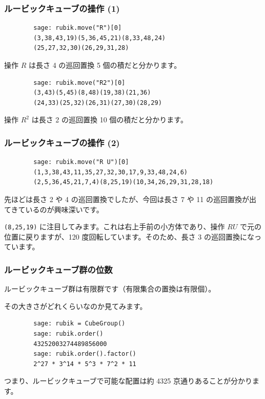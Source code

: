 \documentclass{beamer}
\begin{document}
\begin{frame}[fragile=singleslide]
    \frametitle{ルービックキューブの操作 (1)}

    \begin{verbatim}
        sage: rubik.move("R")[0]
        (3,38,43,19)(5,36,45,21)(8,33,48,24)
        (25,27,32,30)(26,29,31,28)
    \end{verbatim}

    \bigskip

    操作 \(R\) は長さ 4 の巡回置換 5 個の積だと分かります。

    \bigskip

    \begin{verbatim}
        sage: rubik.move("R2")[0]
        (3,43)(5,45)(8,48)(19,38)(21,36)
        (24,33)(25,32)(26,31)(27,30)(28,29)
    \end{verbatim}

    \bigskip

    操作 \(R^2\) は長さ 2 の巡回置換 10 個の積だと分かります。
\end{frame}

\begin{frame}[fragile=singleslide]
    \frametitle{ルービックキューブの操作 (2)}

    \begin{verbatim}
        sage: rubik.move("R U")[0]
        (1,3,38,43,11,35,27,32,30,17,9,33,48,24,6)
        (2,5,36,45,21,7,4)(8,25,19)(10,34,26,29,31,28,18)
    \end{verbatim}

    \bigskip

    先ほどは長さ 2 や 4 の巡回置換でしたが、今回は長さ 7 や 11 の巡回置換が出てきているのが興味深いです。

    \bigskip

    \texttt{(8,25,19)} に注目してみます。これは右上手前の小方体であり、操作 \(R U\) で元の位置に戻りますが、120 度回転しています。そのため、長さ 3 の巡回置換になっています。
\end{frame}

\begin{frame}[fragile=singleslide]
    \frametitle{ルービックキューブ群の位数}

    ルービックキューブ群は有限群です（有限集合の置換は有限個）。

    \bigskip

    その大きさがどれくらいなのか見てみます。

    \begin{verbatim}
        sage: rubik = CubeGroup()
        sage: rubik.order()
        43252003274489856000
        sage: rubik.order().factor()
        2^27 * 3^14 * 5^3 * 7^2 * 11
    \end{verbatim}

    \bigskip

    つまり、ルービックキューブで可能な配置は約 4325 京通りあることが分かります。
\end{frame}
\end{document}

